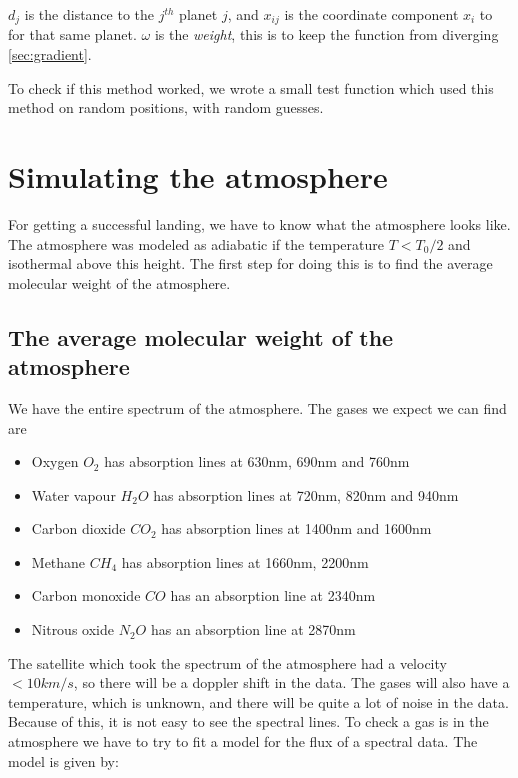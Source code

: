 \documentclass[a4paper, 10pt]{article}
\begin{document}
$d_j$ is the distance to the $j^{th}$ planet $j$, and $x_{ij}$ is the coordinate component $x_i$ to for that same planet. $\omega$ is the \textit{weight}, this is to keep the function from diverging \ref{sec:gradient}.

To check if this method worked, we wrote a small test function which used this method on random positions, with random guesses.




\section{Simulating the atmosphere}

For getting a successful landing, we have to know what the atmosphere looks like. The atmosphere was modeled as adiabatic if the temperature $T < T_0/2$ and isothermal above this height. The first step for doing this is to find the average molecular weight of the atmosphere.

\subsection{The average molecular weight of the atmosphere}

We have the entire spectrum of the atmosphere. The gases we expect we can find are

\begin{itemize}
\item Oxygen  $O_2$ has  absorption  lines  at  630nm,
690nm and 760nm
\item Water  vapour  $H_2O$  has  absorption  lines  at
720nm,  820nm  and  940nm
\item Carbon dioxide $CO_2$ has absorption lines at
1400nm and 1600nm
\item Methane $CH_4$ has   absorption   lines   at
1660nm,  2200nm
\item Carbon monoxide $CO$ has an absorption line
at 2340nm
\item Nitrous oxide $N_2O$ has  an  absorption  line  at  2870nm
\end{itemize}

The satellite which took the spectrum of the atmosphere had a velocity $< 10 km/s$, so there will be a doppler shift in the data. The gases will also have a temperature, which is unknown, and there will be quite a lot of noise in the data. Because of this, it is not easy to see the spectral lines. To check a gas is in the atmosphere we have to try to fit a model for the flux of a spectral data. The model is given by:
\end{document}
